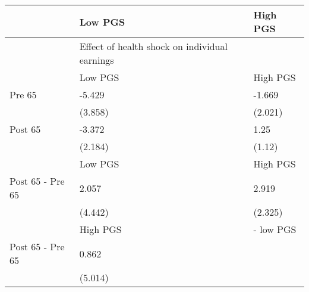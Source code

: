 % 
\begin{tabular}{lll}
  \hline
 & Low PGS & High PGS \\ 
  \hline
 & Effect of health shock on individual earnings &  \\ 
   & Low PGS & High PGS \\ 
  Pre 65 & -5.429 & -1.669 \\ 
   & (3.858) & (2.021) \\ 
  Post 65 & -3.372 & 1.25 \\ 
   & (2.184) & (1.12) \\ 
   & Low PGS & High PGS \\ 
  Post 65 - Pre 65 & 2.057 & 2.919 \\ 
   & (4.442) & (2.325) \\ 
   & High PGS  & - low PGS \\ 
  Post 65 - Pre 65 & 0.862 &  \\ 
   & (5.014) &  \\ 
   \hline
\end{tabular}
